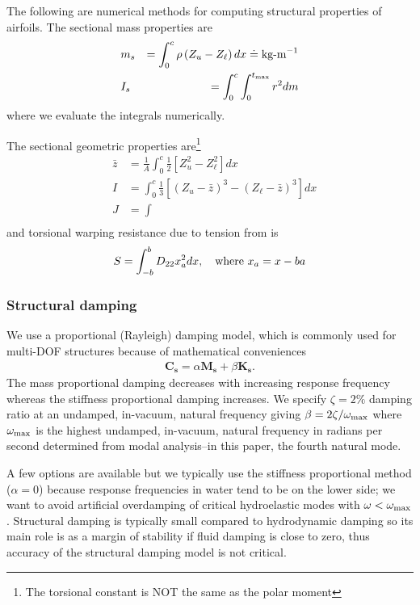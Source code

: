 \documentclass[10pt]{article}
\newcommand{\mbf}[1]{\mathbf{#1}}
\newcommand{\be}{\begin{eqnarray}}
\newcommand{\ee}{\end{eqnarray}}
\newcommand{\ben}{\begin{eqnarray*}}
\newcommand{\een}{\end{eqnarray*}}
\newcommand{\tn}[1]{\textnormal{#1}}
\begin{document}
The following are numerical methods for computing structural properties of airfoils.
The sectional mass properties are
\be
& m_s & = \int_{0}^{c} \rho \left(Z_u - Z_\ell \right)  dx \doteq \tn{kg-m}^{-1}
\\
& I_s & = \int_{0}^{c}\int_{0}^{t_{\tn{max}}} r^2 dm
\ee
where we evaluate the integrals numerically.

The sectional geometric properties are\footnote{The torsional constant is NOT the same as the polar moment}
\be
& \bar{z} & =\frac{1}{A} \int_0^c \frac{1}{2}\left[Z_u^2-Z_{\ell}^2\right] d x \\
& I & =\int_0^c \frac{1}{3}\left[\left(Z_u-\bar{z}\right)^3-\left(Z_{\ell}-\bar{z}\right)^3\right] d x \\
& J &= \int \\
\ee
and torsional warping resistance due to tension from \citet{LOTTATI1985} is
\be
S = \int_{-b}^b D_{22} x_a^2 d x, \quad\tn{where } x_a = x - ba
\ee
\subsubsection{Structural damping}
% 
We use a proportional (Rayleigh) damping model, which is commonly used for multi-DOF structures because of mathematical conveniences
\ben
\mbf{C_s} = \alpha \mbf{M_s} + \beta \mbf{K_s}.
\een
The mass proportional damping decreases with increasing response frequency whereas the stiffness proportional damping increases.
We specify $\zeta = 2\%$ damping ratio at an undamped, in-vacuum, natural frequency giving
$\beta = {2 \zeta}/{\omega_{\tn{max}}}$
where $\omega_{\tn{max}}$ is the highest undamped, in-vacuum, natural frequency in radians per second determined from modal analysis--in this paper, the fourth natural mode.

A few options are available but we typically use the stiffness proportional method ($\alpha=0$) because response frequencies in water tend to be on the lower side;
we want to avoid artificial overdamping of critical hydroelastic modes with $\omega < \omega_{\tn{max}}$.
Structural damping is typically small compared to hydrodynamic damping so its main role is as a margin of stability if fluid damping is close to zero, thus accuracy of the structural damping model is not critical.
% 
\end{document}
